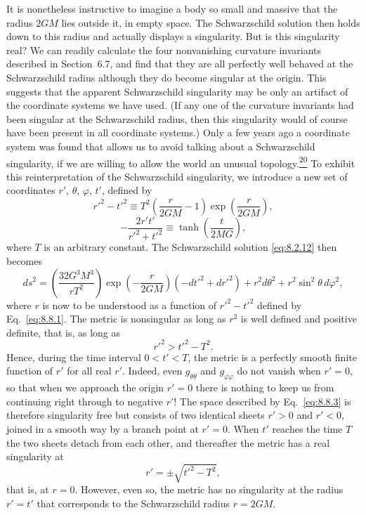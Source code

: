 It is nonetheless instructive to imagine a body so small and massive that
the radius \(2GM\) lies outside it, in empty space. The Schwarzschild
solution then holds down to this radius and actually displays a singularity.
But is this singularity real? We can readily calculate the four
nonvanishing curvature invariants described in Section~6.7, and find that
they are all perfectly well behaved at the Schwarzschild radius although
they do become singular at the origin. This suggests that the apparent
Schwarzschild singularity may be only an artifact of the coordinate systems
we have used. (If any one of the curvature invariants had been singular at
the Schwarzschild radius, then this singularity would of course have been
present in all coordinate systems.) Only a few years ago a coordinate
system was found that allows us to avoid talking about a Schwarzschild
singularity, if we are willing to allow the world an unusual
topology.\hyperref[ch8-ref-20]{\textsuperscript{20}} To exhibit this
reinterpretation of the Schwarzschild singularity, we introduce a new set
of coordinates \(r'\), \(\theta\), \(\varphi\), \(t'\), defined by
\begin{equation}
  r'^2-t'^2
  \equiv
  T^2\left(\frac{r}{2GM}-1\right)
  \exp\left(\frac{r}{2GM}\right),
  \tag{8.8.1}\label{eq:8.8.1}
\end{equation}
\begin{equation}
  -\frac{2r't'}{r'^2+t'^2}
  \equiv
  \tanh\left(\frac{t}{2MG}\right),
  \tag{8.8.2}\label{eq:8.8.2}
\end{equation}
where \(T\) is an arbitrary constant. The Schwarzschild solution
\eqref{eq:8.2.12} then becomes
\begin{equation}
  ds^2
  =
  \left(\frac{32G^3M^3}{rT^2}\right)
  \exp\left(-\frac{r}{2GM}\right)
  (-dt'^2+dr'^2)
  +r^2d\theta^2+r^2\sin^2\theta\,d\varphi^2,
  \tag{8.8.3}\label{eq:8.8.3}
\end{equation}
where \(r\) is now to be understood as a function of \(r'^2-t'^2\)
defined by Eq.~\eqref{eq:8.8.1}. The metric is nonsingular as long as
\(r^2\) is well defined and positive definite, that is, as long as
\[
  r'^2>t'^2-T^2.
\]
Hence, during the time interval \(0<t'<T\), the metric is a perfectly
smooth finite function of \(r'\) for all real \(r'\). Indeed, even
\(g_{\theta\theta}\) and \(g_{\varphi\varphi}\) do not vanish when
\(r'=0\), so that when we approach the origin \(r'=0\) there is nothing to
keep us from continuing right through to negative \(r'\)! The space
described by Eq.~\eqref{eq:8.8.3} is therefore singularity free but
consists of two identical sheets \(r'>0\) and \(r'<0\), joined in a smooth
way by a branch point at \(r'=0\). When \(t'\) reaches the time \(T\) the
two sheets detach from each other, and thereafter the metric has a real
singularity at
\[
  r'=\pm\sqrt{t'^2-T^2},
\]
that is, at \(r=0\). However, even so, the metric has no singularity at the
radius \(r'=t'\) that corresponds to the Schwarzschild radius \(r=2GM\).

